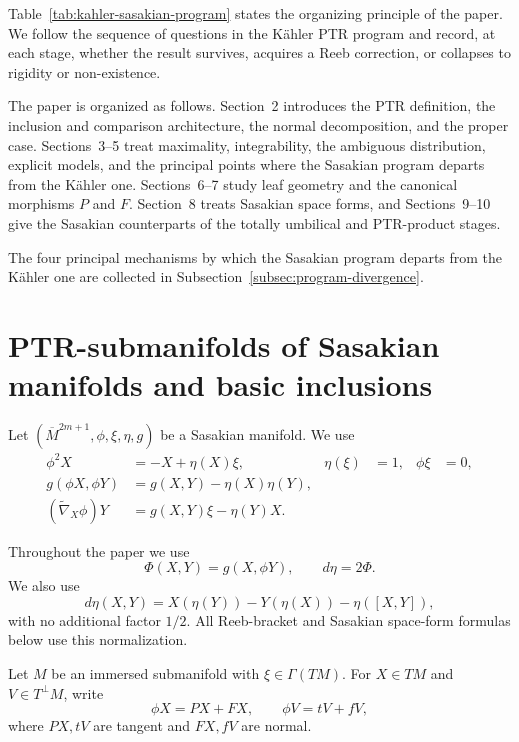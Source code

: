 \documentclass[11pt]{article}
\theoremstyle{definition}\newtheorem{definition}[theorem]{Definition}\newtheorem{example}[theorem]{Example}
\theoremstyle{remark}\newtheorem{remark}[theorem]{Remark}
\newcommand{\Mbar}{\overline M}\newcommand{\Dperp}{\mathcal D^{\perp}}\newcommand{\Dtilde}{\widetilde{\mathcal D}}
\newcommand{\Tperp}{T^{\perp}M}
\begin{document}
Table~\ref{tab:kahler-sasakian-program} states the organizing principle of
the paper.  We follow the sequence of questions in the K\"ahler PTR
program and record, at each stage, whether the result survives, acquires a
Reeb correction, or collapses to rigidity or non-existence.

The paper is organized as follows. Section~2 introduces the PTR definition,
the inclusion and comparison architecture, the normal decomposition, and
the proper case. Sections~3--5 treat maximality, integrability, the
ambiguous distribution, explicit models, and the principal points where
the Sasakian program departs from the K\"ahler one. Sections~6--7 study
leaf geometry and the canonical morphisms \(P\) and \(F\). Section~8
treats Sasakian space forms, and Sections~9--10 give the Sasakian
counterparts of the totally umbilical and PTR-product stages.

The four principal mechanisms by which the Sasakian program departs from
the K\"ahler one are collected in
Subsection~\ref{subsec:program-divergence}.

\section{PTR-submanifolds of Sasakian manifolds and basic inclusions}
Let $(\Mbar^{2m+1},\phi,\xi,\eta,g)$ be a Sasakian manifold. We use
\begin{align}
 \phi^2X&=-X+\eta(X)\xi, & \eta(\xi)&=1, & \phi\xi&=0,\label{eq:sas1}\\
 g(\phi X,\phi Y)&=g(X,Y)-\eta(X)\eta(Y),\label{eq:sas2}\\
 (\widetilde\nabla_X\phi)Y&=g(X,Y)\xi-\eta(Y)X.\label{eq:sas3}
\end{align}

Throughout the paper we use
\[
\Phi(X,Y)=g(X,\phi Y),\qquad d\eta=2\Phi.
\]
We also use
\[
d\eta(X,Y)=X(\eta(Y))-Y(\eta(X))-\eta([X,Y]),
\]
with no additional factor \(1/2\).  All Reeb-bracket and Sasakian
space-form formulas below use this normalization.

Let $M$ be an immersed submanifold with $\xi\in\Gamma(TM)$. For $X\in TM$ and $V\in\Tperp$, write
\begin{equation}\label{eq:decomp}
 \phi X=PX+FX,\qquad \phi V=tV+fV,
\end{equation}
where $PX,tV$ are tangent and $FX,fV$ are normal.
\end{document}
